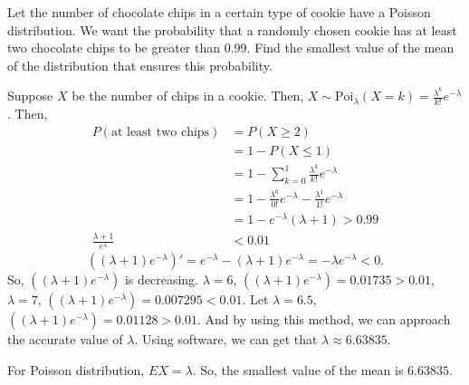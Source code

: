 \documentclass[14pt]{elegantbook}
\begin{document}
    \setcounter{exer}{6}
    \begin{exercise}
        Let the number of chocolate chips in a certain type of cookie have a Poisson distribution. We want the probability that a randomly chosen cookie has at least two chocolate chips to be greater than $0.99$. Find the smallest value of the mean of the distribution that ensures this probability. 
    \end{exercise}

    \begin{solution}
        Suppose $X$ be the number of chips in a cookie. Then, $X\sim\text{Poi}_\lambda(X=k)=\frac{\lambda^k}{k!}e^{-\lambda}$. Then, 
        \begin{align*}
            P(\text{at least two chips})&=P(X\geq 2)\\
            &=1-P(X\leq 1)\\
            &=1-\sum_{k=0}^1\frac{\lambda^k}{k!}e^{-\lambda}\\ 
            &=1-\frac{\lambda^0}{0!}e^{-\lambda}-\frac{\lambda^1}{1!}e^{-\lambda}\\
            &=1-e^{-\lambda}(\lambda+1)>0.99\\
            \frac{\lambda+1}{e^\lambda}&<0.01
        \end{align*}
        \[\left((\lambda+1)e^{-\lambda}\right)'=e^{-\lambda}-(\lambda+1)e^{-\lambda}=-\lambda e^{-\lambda}<0. \]
        So, $\left((\lambda+1)e^{-\lambda}\right)$ is decreasing. $\lambda=6$, $\left((\lambda+1)e^{-\lambda}\right)=0.01735>0.01$, $\lambda=7$, $\left((\lambda+1)e^{-\lambda}\right)=0.007295<0.01$. Let $\lambda=6.5$, $\left((\lambda+1)e^{-\lambda}\right)=0.01128>0.01$. And by using this method, we can approach the accurate value of $\lambda$. Using software, we can get that $\lambda\approx 6.63835$. 

        For Poisson distribution, $EX=\lambda$. So, the smallest value of the mean is $6.63835$.
    \end{solution}
\end{document}
